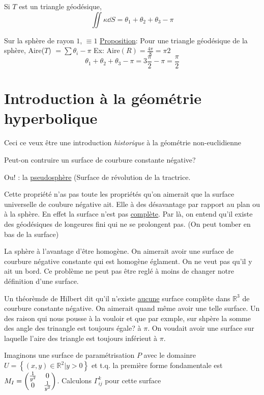 \begin{tcolorbox}[title=Rappel]
	 Si $T$ est un triangle géodésique, $$\iint \kappa \dd S = \theta_1 + \theta_2 +\theta_3 - \pi$$  

\end{tcolorbox}

Sur la sphère de rayon $1$, $\equiv 1$  
\underline{Proposition}: Pour une triangle géodésique de la sphère, Aire($T$) $= \sum \theta_i - \pi$ Ex: $\text{Aire}(R) = \frac{4\pi}{8} = \pi 2 $ $$\theta_1 + \theta_2 + \theta_3 - \pi = 3 \frac{\pi}{2} -\pi = \frac{\pi}{2} $$   




\section*{Introduction à la géométrie hyperbolique}

Ceci ce veux être une introduction \textit{historique} à la géométrie non-euclidienne

Peut-on contruire un surface de courbure constante négative?

Ou! : la \underline{pseudosphère} (Surface de révolution de la tractrice.

Cette propriété n'as pas toute les propriétés qu'on aimerait que la surface universelle de coubure négative ait. Elle à des désavantage par rapport au plan ou à la sphère. En effet la surface n'est pas \underline{complète}. Par là, on entend qu'il existe des géodésiques de longeures fini qui ne se prolongent pas. (On peut tomber en bas de la surface)


La sphère à l'avantage d'être homogène. On aimerait avoir une surface de courbure négative constante qui est homogène églament. On ne veut pas qu'il y ait un bord. Ce problème ne peut pas être reglé à moins de changer notre définition d'une surface.

Un théorèmde de Hilbert dit qu'il n'existe \underline{aucune} surface  complète dans $\mathbb{R}^{3}$ de courbure constante négative. On aimerait quand même avoir une telle surface. Un des raison qui nous pousse à la vouloir et que par exmple, sur shpère la somme des angle des trinangle est toujours égale?  à $\pi$. On voudait avoir une surface sur laquelle l'aire des triangle est toujours inférieut à $\pi$.


Imaginons une surface de paramétrisation $P$ avec le domainre $U = \left\{ (x,y) \in \mathbb{R}^{2} | y > 0 \right\} $ et t.q. la première forme fondamentale est $M_I = \begin{pmatrix}  \frac{1}{y^2} & 0 \\ 0 & \frac{1}{y^2}  \end{pmatrix}$. Calculons $\Gamma_{ij}^k$ pour cette surface   


